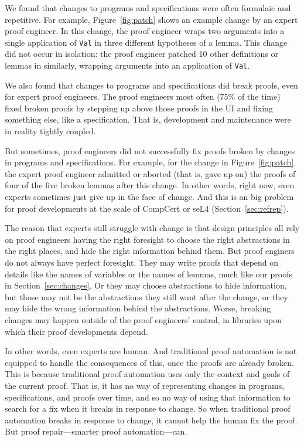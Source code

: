 We found that changes to programs and specifications were often formulaic and repetitive.
For example, Figure~\ref{fig:patch} shows an example change by an expert proof engineer.
In this change, the proof engineer wraps two arguments into a single application of \lstinline{Val}
in three different hypotheses of a lemma.
This change did not occur in isolation: the proof engineer patched 10 other definitions or lemmas
in similarly, wrapping arguments into an application of
\lstinline{Val}.

We also found that changes to programs and specifications did break proofs, even for expert proof engineers.
The proof engineers most often (75\% of the time) fixed broken proofs by stepping 
up above those proofs in the UI and fixing something else, like a specification.
That is, development and maintenance were in reality tightly coupled.

But sometimes, proof engineers did not successfully fix proofs broken by changes in programs and specifications.
For example, for the change in Figure~\ref{fig:patch},
the expert proof engineer admitted or aborted (that is, gave up on) the proofs of four of the five
broken lemmas after this change.
In other words, right now, even experts sometimes just give up in the face of change.
And this is an big problem for proof developments
at the scale of CompCert or seL4 (Section~\ref{sec:refrep}).

The reason that experts still struggle with change is that
design principles all rely on proof engineers having the right foresight to choose the 
right abstractions in the right places, and hide the right information behind them.
But proof enginers do not always have perfect foresight.
They may write proofs that depend on details like the names of variables or the names of lemmas,
much like our proofs in Section~\ref{sec:changes}.
Or they may choose abstractions to hide information, but those may not be the abstractions they still want after the change,
or they may hide the wrong information behind the abstractions.
Worse, breaking changes may happen outside of the proof engineers' control,
in libraries upon which their proof developments depend.

In other words, even experts are human.
And traditional proof automation is not equipped to handle the consequences of this,
once the proofs are already broken.
This is because traditional proof automation uses only the context and goals of the current proof.
That is, it has no way of representing changes in programs, specifications, and proofs over time,
and so no way of using that information to search for a fix when it breaks in response to change.
So when traditional proof automation breaks in response to change,
it cannot help the human fix the proof.
But proof repair---smarter proof automation---can.


